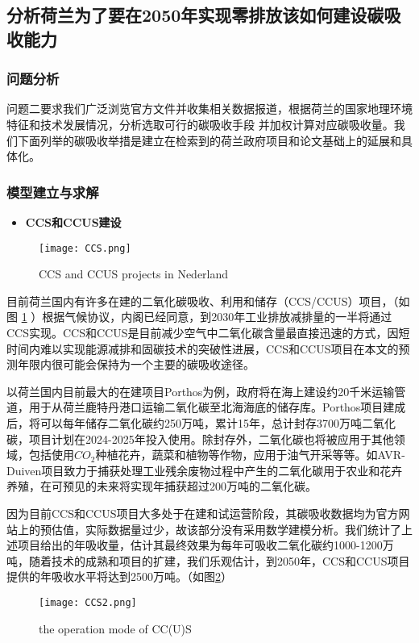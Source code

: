 \documentclass[bwprint]{gmcmthesis}
\numberwithin{figure}{section}
\begin{document}
\subsection{分析荷兰为了要在2050年实现零排放该如何建设碳吸收能力}
\subsubsection{问题分析}
问题二要求我们广泛浏览官方文件并收集相关数据报道，根据荷兰的国家地理环境特征和技术发展情况，分析选取可行的碳吸收手段
并加权计算对应碳吸收量。我们下面列举的碳吸收举措是建立在检索到的荷兰政府项目和论文基础上的延展和具体化。
\subsubsection{模型建立与求解}
\begin{itemize}
	\item \textbf{CCS和CCUS建设}
\end{itemize}
\begin{figure}[!h]
	\centering
	\texttt{[image: CCS.png]}
	\caption{CCS and CCUS projects in Nederland}
	\label{fig_9}
\end{figure}

目前荷兰国内有许多在建的二氧化碳吸收、利用和储存（CCS/CCUS）项目，（如图 \ref{fig_9} ）根据气候协议，内阁已经同意，到2030年工业排放减排量的一半将通过CCS实现。CCS和CCUS是目前减少空气中二氧化碳含量最直接迅速的方式，因短时间内难以实现能源减排和固碳技术的突破性进展，CCS和CCUS项目在本文的预测年限内很可能会保持为一个主要的碳吸收途径。

以荷兰国内目前最大的在建项目Porthos为例，政府将在海上建设约20千米运输管道，用于从荷兰鹿特丹港口运输二氧化碳至北海海底的储存库。Porthos项目建成后，将可以每年储存二氧化碳约250万吨，累计15年，总计封存3700万吨二氧化碳，项目计划在2024-2025年投入使用。除封存外，二氧化碳也将被应用于其他领域，包括使用$CO_2$种植花卉，蔬菜和植物等作物，应用于油气开采等等。如AVR-Duiven项目致力于捕获处理工业残余废物过程中产生的二氧化碳用于农业和花卉养殖，在可预见的未来将实现年捕获超过200万吨的二氧化碳。

因为目前CCS和CCUS项目大多处于在建和试运营阶段，其碳吸收数据均为官方网站上的预估值，实际数据量过少，故该部分没有采用数学建模分析。我们统计了上述项目给出的年吸收量，估计其最终效果为每年可吸收二氧化碳约1000-1200万吨，随着技术的成熟和项目的扩建，我们乐观估计，到2050年，CCS和CCUS项目提供的年吸收水平将达到2500万吨。（如图\ref{fig_10}）

\begin{figure}[!h]
	\centering
	\texttt{[image: CCS2.png]}
	\caption{the operation mode of CC(U)S}
	\label{fig_10}
\end{figure}
\end{document}
